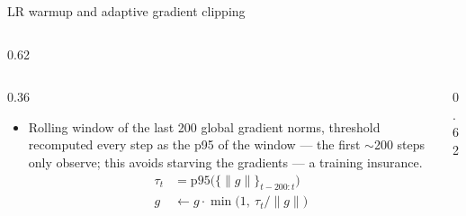 \begin{frame}{LR warmup and adaptive gradient clipping}
\begin{columns}[c]
\begin{column}{0.62\textwidth}
    \end{column}
  \end{columns}
  \vspace{6pt}
  \begin{columns}[c]
    \begin{column}{0.36\textwidth}
      \hspace*{5mm}\begin{minipage}{\dimexpr\linewidth-5mm\relax}
      \footnotesize
      \begin{itemize}
        \item Rolling window of the last 200 global gradient norms, threshold
              recomputed every step as the p95 of the window --- the first $\sim$200
              steps only observe; this avoids starving the gradients ---
              a training insurance.
              {\scriptsize\[\begin{aligned}
                 \tau_t  &= \mathrm{p95}\big(\{\lVert g\rVert\}_{t-200:t}\big)\\[6pt]
                 g       &\leftarrow g \cdot \min\!\big(1,\ \tau_t/\lVert g\rVert\big)
               \end{aligned}\]}
      \end{itemize}
      \end{minipage}
    \end{column}
    \begin{column}{0.62\textwidth}
      \hspace*{2mm}%
\end{column}
\end{columns}
\end{frame}
